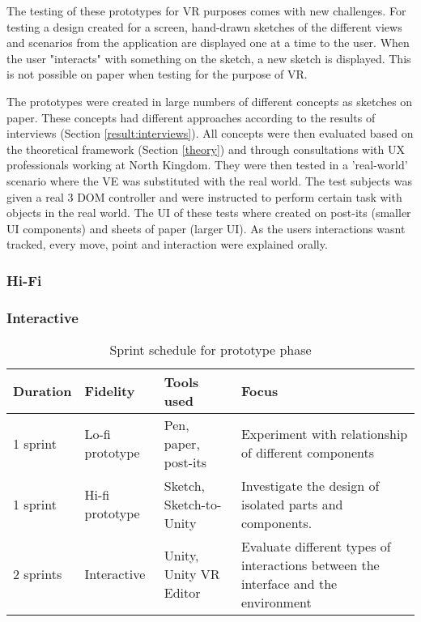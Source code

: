 The testing of these prototypes for VR purposes comes with new challenges. For testing a design created for a screen, hand-drawn sketches of the different views and scenarios from the application are displayed one at a time to the user. When the user "interacts" with something on the sketch, a new sketch is displayed\cite{proto:boling1997holistic}. This is not possible on paper when testing for the purpose of VR.

The prototypes were created in large numbers of different concepts as sketches on paper. These concepts had different approaches according to the results of interviews (Section \ref{result:interviews}). All concepts were then evaluated based on the theoretical framework (Section \ref{theory}) and through consultations with UX professionals working at North Kingdom. They were then tested in a 'real-world' scenario where the VE was substituted with the real world. The test subjects was given a real 3 DOM controller and were instructed to perform certain task with objects in the real world. The UI of these tests where created on post-its (smaller UI components) and sheets of paper (larger UI). As the users interactions wasnt tracked, every move, point and interaction were explained orally.
\subsubsection{Hi-Fi}
\label{method:prototype:hifi}
\subsubsection{Interactive}
\label{method:prototype:interactive}


\begin{table}[]
  \centering
  \caption{Sprint schedule for prototype phase}
  \label{table:sprints}
  \begin{tabular}{|l|l|l| p{5cm}|}
     \hline
    \textbf{Duration} & \textbf{Fidelity} & \textbf{Tools used} & \textbf{Focus} \\\hline
    1 sprint                         & Lo-fi prototype  & Pen, paper, post-its    & Experiment with relationship of different components                               \\\hline
    1 sprint                        & Hi-fi prototype & Sketch, Sketch-to-Unity & Investigate the design of isolated parts and components.                           \\\hline
    2 sprints                 & Interactive   & Unity, Unity VR Editor  & Evaluate different types of interactions between the interface and the environment  \\\hline
  \end{tabular}
\end{table}

